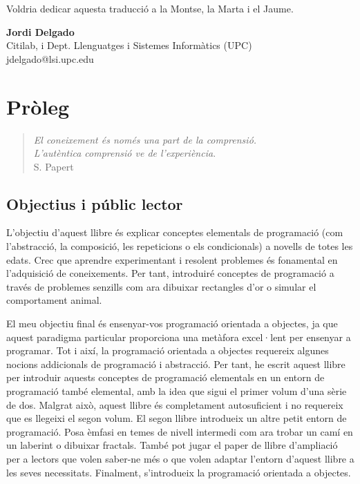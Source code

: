 \vspace*{3mm}

\noindent
Voldria dedicar aquesta traducció a la Montse, la Marta i el Jaume. 
\vspace*{5mm}

\noindent
\begin{flushleft}
\textbf{Jordi Delgado}\\
\textsf{Citilab}, i Dept. Llenguatges i Sistemes Informàtics (UPC)\\
\textsf{jdelgado@lsi.upc.edu}\\
\end{flushleft}

\chapter{Pròleg}

\begin{quote}
\begin{flushright}
\emph{El coneixement és només una part de la comprensió.\\ 
L'autèntica comprensió ve de l'experiència}.\\
S. Papert
\end{flushright}
\end{quote}



\section*{Objectius i públic lector}

L'objectiu d'aquest llibre és explicar conceptes elementals de programació
(com l'abstracció, la composició, les repeticions o els condicionals) a novells 
de totes les edats. Crec que aprendre experimentant i resolent problemes és
fonamental en l'adquisició de coneixements. Per tant, introduiré conceptes
de programació a través de problemes senzills com ara dibuixar rectangles d'or
o simular el comportament animal.

El meu objectiu final és ensenyar-vos programació orientada a objectes, ja que
aquest paradigma particular proporciona una metàfora excel·lent per ensenyar a
programar. Tot i així, la programació orientada a objectes requereix algunes
nocions addicionals de programació i abstracció. Per tant, he escrit 
aquest llibre per introduir aquests conceptes de programació elementals en
un entorn de programació també elemental, amb la idea que sigui
el primer volum d'una sèrie de dos. Malgrat això, aquest llibre és completament 
autosuficient i no requereix que es llegeixi el segon volum. El segon llibre
introdueix un altre petit entorn de programació. Posa èmfasi en temes de nivell
intermedi com ara trobar un camí en un laberint o dibuixar fractals. També pot 
jugar el paper de llibre d'ampliació per a lectors que volen saber-ne més o que
volen adaptar l'entorn d'aquest llibre a les seves
necessitats. Finalment, s'introdueix la programació orientada a objectes.

